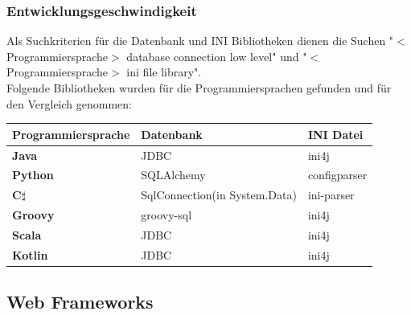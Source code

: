 \documentclass[ngerman]{article}
\begin{document}
    \subsubsection{Entwicklungsgeschwindigkeit}
    \label{GrundlagenEntwicklungsgeschwindigkeit}
    Als Suchkriterien für die Datenbank und INI Bibliotheken dienen die Suchen "$<$Programmiersprache$>$ database connection low level" und "$<$Programmiersprache$>$ ini file library".\\
    Folgende Bibliotheken wurden für die Programmiersprachen gefunden und für den Vergleich genommen:
    \begin{tabularx}{\textwidth}{|X|X|X|}
        \hline
        \textbf{Programmiersprache}&\textbf{Datenbank}&\textbf{INI Datei}\\
        \hline
        \textbf{Java}&JDBC&ini4j\\
        \hline
        \textbf{Python}&SQLAlchemy&configparser\\
        \hline
        \textbf{C$\sharp$}&SqlConnection(in System.Data)&ini-parser\\
        \hline
        \textbf{Groovy}&groovy-sql&ini4j\\
        \hline
        \textbf{Scala}&JDBC&ini4j\\
        \hline
        \textbf{Kotlin}&JDBC&ini4j\\
        \hline
    \end{tabularx}
    \subsection{Web Frameworks}
\end{document}

